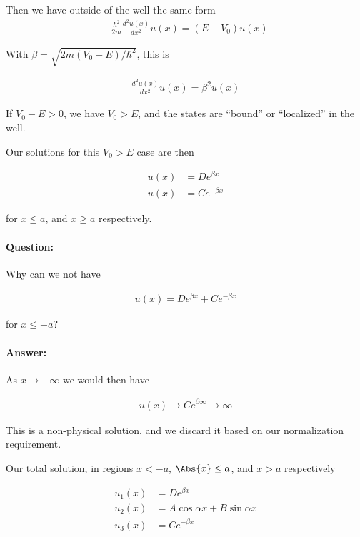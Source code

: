 Then we have outside of the well the same form
\begin{align}\label{eqn:PHY356Lecture9:33}
-\frac{\hbar^2 }{2m} \frac{d^2 u(x)}{dx^2} u(x) = (E - V_0 )u(x)
\end{align}

With $\beta = \sqrt{ 2m (V_0 - E)/\hbar^2}$, this is

\begin{align}\label{eqn:PHY356Lecture9:34}
\frac{d^2 u(x)}{dx^2} u(x) = \beta^2 u(x)
\end{align}

If $V_0 - E > 0$, we have $V_0 > E$, and the states are ``bound'' or ``localized'' in the well.

Our solutions for this $V_0 > E$ case are then

\begin{align}\label{eqn:PHY356Lecture9:35}
u(x) &= D e^{\beta x} \\
u(x) &= C e^{-\beta x}
\end{align}

for $x \le a$, and $x \ge a$ respectively.

\paragraph{Question:} Why can we not have

\begin{align}\label{eqn:PHY356Lecture9:36}
u(x) = D e^{\beta x} + C e^{-\beta x}
\end{align}

for $x \le -a$?

\paragraph{Answer:} As $x \rightarrow -\infty$ we would then have

\begin{align*}
u(x) \rightarrow C e^{\beta \infty} \rightarrow \infty
\end{align*}

This is a non-physical solution, and we discard it based on our normalization requirement.

Our total solution, in regions $x < -a$, $\Abs{x} \le a$, and $x > a$ respectively

\begin{align*}
u_1(x) &= D e^{\beta x} \\
u_2(x) &= A \cos\alpha x + B \sin\alpha x \\
u_3(x) &= C e^{-\beta x}
\end{align*}

